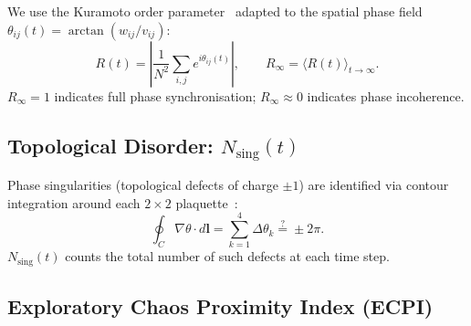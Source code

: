 \documentclass[11pt,a4paper]{article}
\begin{document}
We use the Kuramoto order
parameter~\cite{Kuramoto1984,Strogatz2000} adapted to the
spatial phase field $\theta_{ij}(t) = \arctan(w_{ij}/v_{ij})$:
\begin{equation}
    R(t) = \left| \frac{1}{N^2} \sum_{i,j}
    e^{i\theta_{ij}(t)} \right|, \qquad
    R_\infty = \langle R(t) \rangle_{t \to \infty}.
\end{equation}
$R_\infty = 1$ indicates full phase synchronisation;
$R_\infty \approx 0$ indicates phase incoherence.

\subsection{Topological Disorder: $N_{\text{sing}}(t)$}

Phase singularities (topological defects of charge $\pm 1$) are
identified via contour integration around each $2\times 2$
plaquette~\cite{Winfree1987,Biktashev1994}:
\begin{equation}
    \oint_C \nabla\theta \cdot d\mathbf{l}
    = \sum_{k=1}^{4} \Delta\theta_k
    \stackrel{?}{=} \pm 2\pi.
\end{equation}
$N_{\text{sing}}(t)$ counts the total number of such defects
at each time step.

\subsection{Exploratory Chaos Proximity Index (ECPI)}
\end{document}
